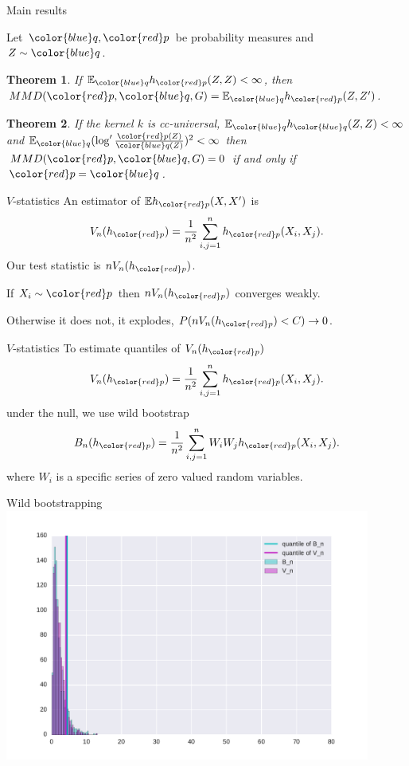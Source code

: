 \documentclass{beamer}
\newtheorem{thm}{Theorem}
\begin{document}
\begin{frame}{Main results}

Let ${ \color{blue} q},{\color{red} p}$ be probability measures and $Z\sim { \color{blue} q}$. 
\begin{thm}
If $\ev_{{ \color{blue} q}} h_{{\color{red} p}}(Z,Z)<\infty$, then $MMD({\color{red} p},{ \color{blue} q},G) = \ev_{{ \color{blue} q}} h_{{\color{red} p}}(Z,Z')$.
\end{thm}
\begin{thm}
 If the kernel $k$ is cc-universal, $\ev_{{ \color{blue} q}} h_{{ \color{blue} q}}(Z,Z)<\infty$ and $\ev_{{ \color{blue} q}} (\log' \frac{{\color{red} p}(Z)}{{ \color{blue} q}(Z)})^{2}<\infty$
then $MMD({\color{red} p},{ \color{blue} q},G) =0$ if and only if ${\color{red} p}={ \color{blue} q}$.
\end{thm}

\end{frame} 


 
 \begin{frame}{$V$-statistics}
An estimator of $\ev h_{\color{red} p}(X,X')$ is
\[
 V_n(h_{\color{red} p}) = \frac {1} {n^2} \sum_{i,j=1}^n h_{\color{red} p}(X_i,X_j).
\]
Our test statistic is $ n V_n(h_{\color{red} p})$.

If $X_i \sim {\color{red} p}$ then $ n V_n(h_{\color{red} p})$  converges weakly. 

Otherwise it does not,  it explodes, $P(n V_n(h_{\color{red} p}) <C) \to 0$.
 \end{frame}
 
 
  \begin{frame}{$V$-statistics}
To estimate quantiles of $ V_n(h_{\color{red} p})$  
\[
 V_n(h_{\color{red} p}) = \frac {1} {n^2} \sum_{i,j=1}^n h_{\color{red} p}(X_i,X_j).
\]
under the null, we use wild bootstrap
\[
 B_n(h_{\color{red} p}) = \frac {1} {n^2} \sum_{i,j=1}^n W_i W_j h_{\color{red} p}(X_i,X_j).
\]
  where $W_i$ is a specific series of zero valued random variables.
\end{frame}

 \begin{frame}{Wild bootstrapping}
 \includegraphics[width=0.9\textwidth]{./img/bootstrapWorks1.pdf}
\end{frame}
\end{document}
